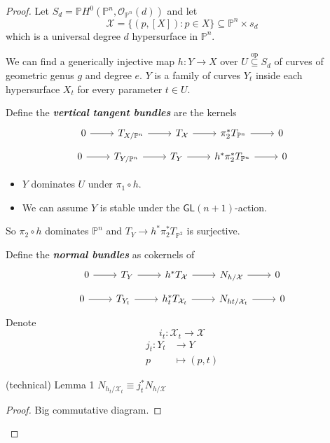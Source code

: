 \begin{proof}\leavevmode
Let $S_d=\mathbb{P}H^{0}(\mathbb{P}^n,\mathcal{O}_{\mathbb{P}^n}(d))$ and let
\[\mathcal{X}=\{(p,[X]):p\in X\}\subseteq \mathbb{P}^n\times s_d\]
which is a universal degree $d$ hypersurface in $\mathbb{P}^n$.

We can find a generically injective map $h:Y\to X$ over $U \overset{\operatorname{o p}}{\subseteq} S_d$ of curves of geometric genus $g$ and degree $e$. {\color{3}$Y$ is a family of curves $Y_t$ inside each hypersurface $X_t$ for every parameter $t\in U$}.

Define the \textit{\textbf{vertical tangent bundles}} are the kernels
\[\begin{tikzcd}0\arrow[r]&T_{X/\mathbb{P}^n}\arrow[r]&T_{\mathcal{X}}\arrow[r]&\pi^* _2T_{\mathbb{P}^n}\arrow[r]&0\end{tikzcd}\]
\[\begin{tikzcd}0\arrow[r]&T_{Y/\mathbb{P}^n}\arrow[r]&T_Y\arrow[r]& h^*\pi^* _2T_{\mathbb{P}^n}\arrow[r]&0\end{tikzcd}\]
\begin{itemize}
\item $Y$ dominates $U$ under $\pi_1\circ h$.
\item We can assume $Y$ is stable under the $\mathsf{GL}(n+1)$-action.
\end{itemize}
So $\pi_2\circ h$ dominates $\mathbb{P}^n$ and $T_Y \longrightarrow h^*\pi^* _2T_{\mathbb{P}^2} $ is surjective.

Define the \textit{\textbf{normal bundles}} as cokernels of
\[\begin{tikzcd}0\arrow[r]&T_Y\arrow[r]&h ^* T_{\mathcal{X}}\arrow[r]&N_{h/\mathcal{X}}\arrow[r]&0\end{tikzcd}\]
\[\begin{tikzcd}0\arrow[r]&T_{Y_t}\arrow[r]&h_t^* T_{\mathcal{X}_t}\arrow[r]&N_{ht/\mathcal{X}_t}\arrow[r]&0\end{tikzcd}\]
Denote
\[i_t:\mathcal{X}_t\to\mathcal{X}\]
\begin{align*}
	j_t:Y_t &\longrightarrow Y \\
	p &\longmapsto (p,t)
\end{align*}

\begin{thing4}{(technical) Lemma 1}\leavevmode
	$N_{h_t/\mathcal{X}_t}\equiv j^* _t N_{h/\mathcal{X}}$
\end{thing4}

\begin{proof}\leavevmode
Big commutative diagram.
\end{proof}


\end{proof}
